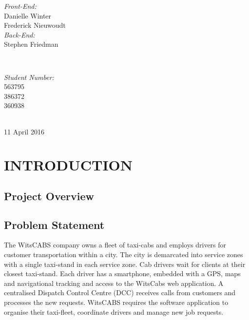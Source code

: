 \documentclass[12pt]{article}
\begin{document}
\begin{titlepage}

\begin{minipage}{0.4\textwidth}
\begin{flushleft} 
\emph{Front-End:}\\
Danielle Winter\\
Frederick Nieuwoudt\\[0.1cm]
\emph{Back-End:}\\
Stephen Friedman
\end{flushleft}
\end{minipage}
~
\begin{minipage}{0.4\textwidth}
\begin{flushright} 
\emph{Student Number:} \\
563795\\
386372\\[0.6cm]
360938
\end{flushright}
\end{minipage}\\[0.5cm]

{\large 11 April 2016}\\[0.5cm]

\begin{abstract}

\end{abstract}

\vfill %

\end{titlepage}
\tableofcontents
\newpage
\section{INTRODUCTION}
\subsection{Project Overview}

\subsection{Problem Statement}
The WitsCABS company owns a fleet of taxi-cabs and employs drivers for customer transportation within a city. The city is demarcated into service zones with a single taxi-stand in each service zone. Cab drivers wait for clients at their closest taxi-stand. Each driver has a smartphone, embedded with a GPS, maps and navigational tracking and access to the WitsCabs web application. A centralised Dispatch Control Centre (DCC) receives calls from customers and processes the new requests. WitsCABS requires the software application to organise their taxi-fleet, coordinate drivers and manage new job requests.
\end{document}
